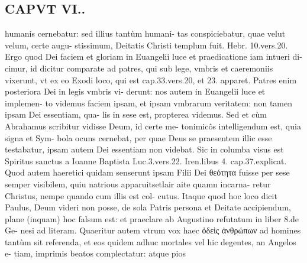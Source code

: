 \documentclass{article}
\begin{document}
\begin{pages}
\section*{CAPVT VI.. }
\marginpar{[ p.491 ]}\pstart humanis cernebatur: sed illius tantùm humani- tas conspiciebatur, quae velut velum, certe augu- stissimum, Deitatis Christi templum fuit. Hebr. 10.vers.20. Ergo quod Dei faciem et gloriam in Euangelii luce et praedicatione iam intueri di- cimur, id dicitur comparate ad patres, qui sub lege, vmbris et caeremoniis vixerunt, vt ex eo Exodi loco, qui est cap.33.vers.20, et 23. apparet. Patres enim posteriora Dei in legis vmbris vi- derunt: nos autem in Euangelii luce et implemen- to videmus faciem ipsam, et ipsam vmbrarum veritatem: non tamen ipsam Dei essentiam, qua- lis in sese est, propterea videmus. Sed et cùm Abrahamus scribitur vidisse Deum, id certe me- tonimicôs intelligendum est, quia signa et Sym- bola ocuns cernebat, per quae Deus se praesentem illic esse testabatur, ipsam autem Dei essentiam non videbat. Sic in columba visus est Spiritus sanctus a Ioanne Baptista Luc.3.vers.22. Iren.libus  4. cap.37.explicat.  \pend\pstart Quod autem haeretici quidam senserunt ipsam Filii Dei θεότητα fuisse per sese semper visibilem, quiu natrious apparuitsetlair aite quamn incarna- retur Christus, nempe quando cum illis est col- cutus. Itaque quod hoc loco dicit Paulus, Deum videri non posse, de sola Patris persona et Deitate accipiendum, plane (inquam) hoc falsum est: et praeclare ab Augustino refutatum in liber 8.de Ge- nesi ad literam.  \pend\pstart Quaeritur autem vtrum vox haec ὀδεὶς ἀνθρώπων ad homines tantùm sit referenda, et eos quidem adhuc mortales vel hic degentes, an Angelos e- tiam, imprimis beatos complectatur: atque pios  \pend

\end{pages}
\end{document}
